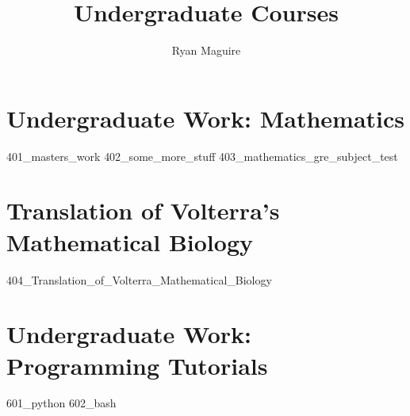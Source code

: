 \documentclass[crop=false,class=book,oneside]{standalone}
\title{Undergraduate Courses}
\author{Ryan Maguire}
\date{\vspace{-5ex}}
\begin{document}
\part{Undergraduate Work: Mathematics}
{401_masters_work}
{402_some_more_stuff}
{403_mathematics_gre_subject_test}
\part{Translation of Volterra's Mathematical Biology}
{404_Translation_of_Volterra_Mathematical_Biology}
\part{Undergraduate Work: Programming Tutorials}
{601_python}
{602_bash}
\end{document}
